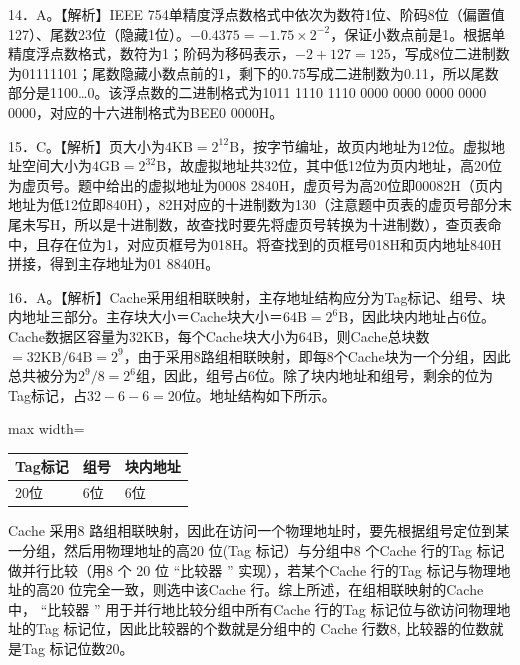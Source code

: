 \documentclass[UTF8,11pt]{ctexart}
\begin{document}
14．A。【解析】IEEE 754单精度浮点数格式中依次为数符1位、阶码8位（偏置值127）、尾数23位（隐藏1位）。\(\displaystyle -0.4375=-1.75\times2^{-2}\)，保证小数点前是1。根据单精度浮点数格式，数符为1；阶码为移码表示，\(\displaystyle -2+127=125\)，写成8位二进制数为01111101；尾数隐藏小数点前的1，剩下的0.75写成二进制数为0.11，所以尾数部分是1100…0。该浮点数的二进制格式为1011 1110 1110 0000 0000 0000 0000 0000，对应的十六进制格式为BEE0 0000H。


15．C。【解析】页大小为\(\displaystyle 4\mathrm{KB}=2^{12}\mathrm{B}\)，按字节编址，故页内地址为12位。虚拟地址空间大小为\(\displaystyle 4\mathrm{GB}=2^{32}\mathrm{B}\)，故虚拟地址共32位，其中低12位为页内地址，高20位为虚页号。题中给出的虚拟地址为0008 2840H，虚页号为高20位即00082H（页内地址为低12位即840H），82H对应的十进制数为130（注意题中页表的虚页号部分末尾未写H，所以是十进制数，故查找时要先将虚页号转换为十进制数），查页表命中，且存在位为1，对应页框号为018H。将查找到的页框号018H和页内地址840H拼接，得到主存地址为01 8840H。


16．A。【解析】Cache采用组相联映射，主存地址结构应分为Tag标记、组号、块内地址三部分。主存块大小＝Cache块大小＝\(\displaystyle 64\mathrm{B}=2^6\mathrm{B}\)，因此块内地址占6位。Cache数据区容量为32KB，每个Cache块大小为64B，则Cache总块数\(\displaystyle =32\mathrm{KB}/64\mathrm{B}=2^9\)，由于采用8路组相联映射，即每8个Cache块为一个分组，因此总共被分为\(\displaystyle 2^9/8=2^6\)组，因此，组号占6位。除了块内地址和组号，剩余的位为Tag标记，占\(\displaystyle 32-6-6=20\)位。地址结构如下所示。


\begin{center}\begin{adjustbox}{max width=\linewidth}\begin{tabular}{|>{\raggedright\arraybackslash}p{\dimexpr(\linewidth-6\tabcolsep-4\arrayrulewidth)/3\relax}|>{\raggedright\arraybackslash}p{\dimexpr(\linewidth-6\tabcolsep-4\arrayrulewidth)/3\relax}|>{\raggedright\arraybackslash}p{\dimexpr(\linewidth-6\tabcolsep-4\arrayrulewidth)/3\relax}|}\hline
Tag标记 & 组号 & 块内地址\\\hline
20位 & 6位 & 6位\\\hline\end{tabular}\end{adjustbox}\end{center}

Cache 采用8 路组相联映射，因此在访问一个物理地址时，要先根据组号定位到某一分组，然后用物理地址的高20 位(Tag 标记）与分组中8 个Cache 行的Tag 标记做并行比较（用8 个 20 位 “比较器 ” 实现），若某个Cache 行的Tag 标记与物理地址的高20 位完全一致，则选中该Cache 行。综上所述，在组相联映射的Cache 中， “比较器 ” 用于并行地比较分组中所有Cache 行的Tag 标记位与欲访问物理地址的Tag 标记位，因此比较器的个数就是分组中的 Cache 行数8, 比较器的位数就是Tag 标记位数20。
\end{document}
